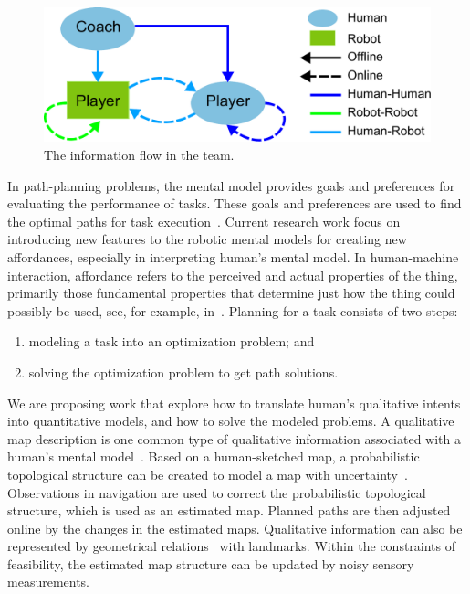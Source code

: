 \documentclass[phd]{byuprop}
\begin{document}
\begin{figure}[hbtp]
\centering
\includegraphics[width=0.6\linewidth]{./fig/team_info_flow.pdf}
\caption{The information flow in the team.}
\label{fig:team_info_flow}
\end{figure}

In path-planning problems, the mental model provides goals and preferences for evaluating the performance of tasks.
These goals and preferences are used to find the optimal paths for task execution~\cite{choset2005principles}.
Current research work focus on introducing new features to the robotic mental models for creating new affordances, especially in interpreting human's mental model.
In human-machine interaction, affordance refers to the perceived and actual properties of the thing, primarily those fundamental properties that determine just how the thing could possibly be used, see, for example, in~\cite{norman2013design}.
Planning for a task consists of two steps:
\begin{enumerate}
\item modeling a task into an optimization problem; and
\item solving the optimization problem to get path solutions.
\end{enumerate}

We are proposing work that explore how to translate human's qualitative intents into quantitative models, and how to solve the modeled problems.
A qualitative map description is one common type of qualitative information associated with a human's mental model~\cite{kuipers1999}.
Based on a human-sketched map, a probabilistic topological structure can be created to model a map with uncertainty~\cite{Shah2013}.
Observations in navigation are used to correct the probabilistic topological structure, which is used as an estimated map.
Planned paths are then adjusted online by the changes in the estimated maps.
Qualitative information can also be represented by geometrical relations~\cite{mcclelland2012qualitative,mcclelland2014qualitative} with landmarks.
Within the constraints of feasibility, the estimated map structure can be updated by noisy sensory measurements.
\end{document}
